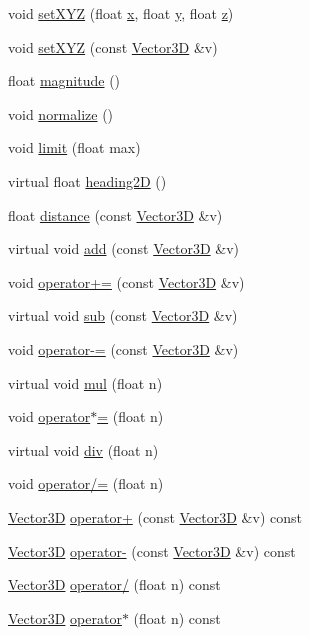 \begin{DoxyCompactItemize}
\item 
void \hyperlink{class_vector3_d_a9e643441263c2f8dc804a19b9f8f792f}{set\+X\+Y\+Z} (float \hyperlink{class_vector3_d_aca5d15bdb846448e3cb73b072783f329}{x}, float \hyperlink{class_vector3_d_a9b6d194fcf526d7d4f9e902421285e94}{y}, float \hyperlink{class_vector3_d_af9728f1eba23b9ee091755346214f391}{z})
\item 
void \hyperlink{class_vector3_d_a782618ba2a379a97febfcf9eefcca5de}{set\+X\+Y\+Z} (const \hyperlink{class_vector3_d}{Vector3\+D} \&v)
\item 
float \hyperlink{class_vector3_d_a1139cce4839680afb01a9612eda6e117}{magnitude} ()
\item 
void \hyperlink{class_vector3_d_abfb12ecb9c9beb88e095cc4a1a512d3c}{normalize} ()
\item 
void \hyperlink{class_vector3_d_a662cc3834556d61ed29890135c280b04}{limit} (float max)
\item 
virtual float \hyperlink{class_vector3_d_ac3f23c65b3f67e4b89cc2b92714517a4}{heading2\+D} ()
\item 
float \hyperlink{class_vector3_d_a9a7e9d08bcee80d419986b875d704e5e}{distance} (const \hyperlink{class_vector3_d}{Vector3\+D} \&v)
\item 
virtual void \hyperlink{class_vector3_d_ac47070b057dc8aeae60ad59cb2b32114}{add} (const \hyperlink{class_vector3_d}{Vector3\+D} \&v)
\item 
void \hyperlink{class_vector3_d_acd0042055681c8d51964fcf972f16124}{operator+=} (const \hyperlink{class_vector3_d}{Vector3\+D} \&v)
\item 
virtual void \hyperlink{class_vector3_d_a7382a2c358e364d2fbfd4c9cc621eac9}{sub} (const \hyperlink{class_vector3_d}{Vector3\+D} \&v)
\item 
void \hyperlink{class_vector3_d_a59565fd3b2f7012dd288c7481a077cb4}{operator-\/=} (const \hyperlink{class_vector3_d}{Vector3\+D} \&v)
\item 
virtual void \hyperlink{class_vector3_d_a24fba77b4f4eef3094ece55b189154de}{mul} (float n)
\item 
void \hyperlink{class_vector3_d_ada5c7b7a4b76631d4110c8dd1b7481ba}{operator$\ast$=} (float n)
\item 
virtual void \hyperlink{class_vector3_d_a2903bc421971e5734281b58ab05f6313}{div} (float n)
\item 
void \hyperlink{class_vector3_d_abaa4a4c2ed6720d9e8552c3c3802796e}{operator/=} (float n)
\item 
\hyperlink{class_vector3_d}{Vector3\+D} \hyperlink{class_vector3_d_a9afe871c53a3edce04a13ba1386122a2}{operator+} (const \hyperlink{class_vector3_d}{Vector3\+D} \&v) const 
\item 
\hyperlink{class_vector3_d}{Vector3\+D} \hyperlink{class_vector3_d_aaf121384ca486a88570b29aba21c5972}{operator-\/} (const \hyperlink{class_vector3_d}{Vector3\+D} \&v) const 
\item 
\hyperlink{class_vector3_d}{Vector3\+D} \hyperlink{class_vector3_d_a4fca1d38e68d3542ac94c01539dbd410}{operator/} (float n) const 
\item 
\hyperlink{class_vector3_d}{Vector3\+D} \hyperlink{class_vector3_d_a9f8ba749fddc5f1fa5cfe976820735f5}{operator$\ast$} (float n) const 
\end{DoxyCompactItemize}
